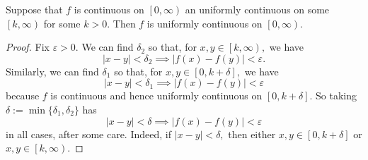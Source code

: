 \begin{exercise}
	Suppose that $f$ is continuous on $\left[0,\infty\right)$ an uniformly continuous on some $\left[k,\infty\right)$ for some $k>0.$ Then $f$ is uniformly continuous on $\left[0,\infty\right).$
\end{exercise}
\begin{proof}
	Fix $\varepsilon>0.$ We can find $\delta_2$ so that, for $x,y\in\left[k,\infty\right),$ we have
	\[|x-y|<\delta_2\implies|f(x)-f(y)|<\varepsilon.\]
	Similarly, we can find $\delta_1$ so that, for $x,y\in[0,k+\delta],$ we have
	\[|x-y|<\delta_1\implies|f(x)-f(y)|<\varepsilon\]
	because $f$ is continuous and hence uniformly continuous on $[0,k+\delta].$ So taking $\delta:=\min\{\delta_1,\delta_2\}$ has
	\[|x-y|<\delta\implies|f(x)-f(y)|<\varepsilon\]
	in all cases, after some care. Indeed, if $|x-y|<\delta,$ then either $x,y\in[0,k+\delta]$ or $x,y\in\left[k,\infty\right).$
\end{proof}